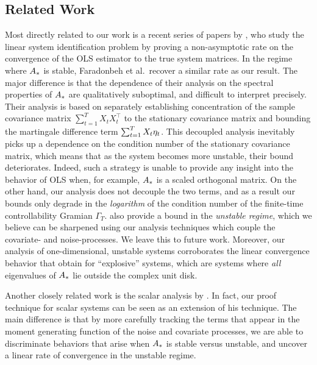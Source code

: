 \subsection{Related Work}

Most directly related to our work is a recent series of papers by 
\cite{faradonbeh17a,faradonbeh17b}, who study the
linear system identification problem by proving a non-asymptotic rate
on the convergence of the OLS estimator to the true system matrices.
In the regime where $A_{*}$ is stable, Faradonbeh et al.\ recover 
a similar rate as our result. The major
difference is that the dependence of their analysis on the spectral properties of
$A_{*}$ are qualitatively suboptimal, and difficult to interpret precisely.
%
Their analysis is based on separately establishing concentration of the
sample covariance matrix $\sum_{t=1}^{T} X_t X_t^\top$ to the stationary
covariance matrix and bounding the martingale difference term $\sum_{t=1}^{T} X_t \eta_t$.
This decoupled analysis inevitably picks up a dependence on the condition
number of the stationary covariance matrix, which means that
as the system becomes more unstable, their bound deteriorates. 
Indeed, such a strategy is unable to provide any insight into the behavior of OLS when,
for example, $A_{*}$ is a scaled orthogonal matrix.
On the other hand, our analysis does not decouple the two terms, and as
a result our bounds only degrade in the \emph{logarithm} of the condition
number of the finite-time controllability Gramian $\Gamma_T$.
\cite{faradonbeh17a} also provide a bound in the \emph{unstable regime}, which
we believe can be sharpened using our analysis techniques which couple the
covariate- and noise-processes. We leave this to future work. Moreover,
our analysis of one-dimensional, unstable systems corroborates the linear
convergence behavior that \cite{faradonbeh17a} obtain for ``explosive'' systems,
which are systems where
\emph{all} eigenvalues of $A_{*}$ lie outside the complex unit disk.


Another closely related work is the scalar analysis by \cite{rantzer18}.
In fact, our proof technique for scalar systems can be seen as an extension of
his technique. The main difference is that by more carefully tracking the terms
that appear in the moment generating function of the noise and covariate processes, we are able to discriminate behaviors that
arise when $A_{*}$ is stable versus unstable, and uncover a linear rate of convergence
in the unstable regime.

